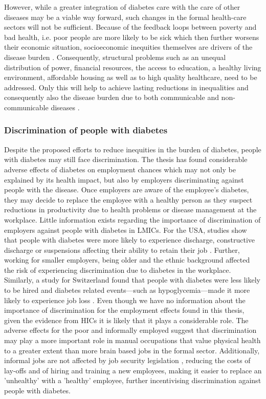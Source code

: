 However, while a greater integration of diabetes care with the care of other diseases may be a viable way forward, such changes in the formal health-care sectors will not be sufficient. Because of the feedback loops between poverty and bad health, i.e. poor people are more likely to be sick which then further worsens their economic situation, socioeconomic inequities themselves are drivers of the disease burden \parencite{DiCesare2013}. Consequently, structural problems such as an unequal distribution of power, financial resources, the access to education, a healthy living environment, affordable housing as well as to high quality healthcare, need to be addressed. Only this will help to achieve lasting reductions in inequalities and consequently also the disease burden due to both communicable and non-communicable diseases \parencite{DiCesare2013}.

\subsubsection{Discrimination of people with diabetes}

Despite the proposed efforts to reduce inequities in the burden of diabetes, people with diabetes may still face discrimination. The thesis has found considerable adverse effects of diabetes on employment chances which may not only be explained by its health impact, but also by employers discriminating against people with the disease. Once employers are aware of the employee's diabetes, they may decide to replace the employee with a healthy person as they suspect reductions in productivity due to health problems or disease management at the workplace. Little information exists regarding the importance of discrimination of employers against people with diabetes in \acp{LMIC}. For the USA, studies show that people with diabetes were more likely to experience discharge, constructive discharge or suspensions affecting their ability to retain their job \parencite{McMahon2005}. Further, working for smaller employers, being older and the ethnic background affected the risk of experiencing discrimination due to diabetes in the workplace. Similarly, a study for Switzerland found that people with diabetes were less likely to be hired and diabetes related events---such as hypoglycemia---made it more likely to experience job loss \parencite{Nebiker-Pedrotti2009}. Even though we have no information about the importance of discrimination for the employment effects found in this thesis, given the evidence from \acp{HIC} it is likely that it plays a considerable role. The adverse effects for the poor and informally employed suggest that discrimination may play a more important role in manual occupations that value physical health to a greater extent than more brain based jobs in the formal sector. Additionally, informal jobs are not affected by job security legislation \parencite{Ulyssea2010,Loayza2011}, reducing the costs of lay-offs and of hiring and training a new employees, making it easier to replace an 'unhealthy' with a 'healthy' employee, further incentivising discrimination against people with diabetes.

